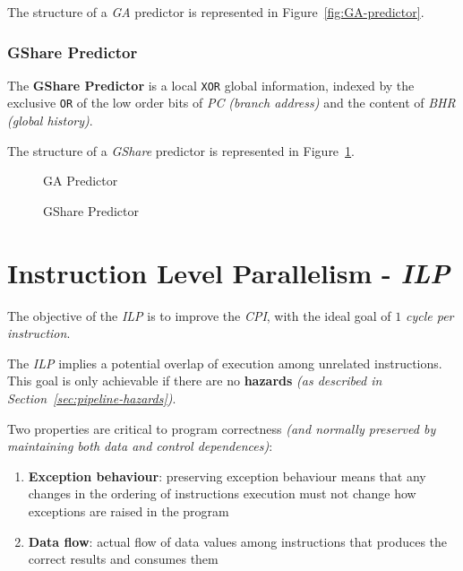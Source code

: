 \documentclass[english]{article}
\begin{document}
The structure of a \textit{GA} predictor is represented in Figure~\ref{fig:GA-predictor}.

\subsubsection{GShare Predictor}

The \textbf{GShare Predictor} is a local \texttt{XOR} global information, indexed by the exclusive \texttt{OR} of the low order bits of \textit{PC} \textit{(branch address)} and the content of \textit{BHR} \textit{(global history)}.

The structure of a \textit{GShare} predictor is represented in Figure~\ref{fig:GShare-predictor}.

\begin{figure}[htbp]
  \bigskip
  \centering
  \begin{minipage}[b]{0.6\textwidth}
    \centering
    \caption{GA Predictor}
    \label{fig:GA-predictor}
  \end{minipage}
  \begin{minipage}[b]{0.39\textwidth}
    \centering
    \caption{GShare Predictor}
    \label{fig:GShare-predictor}
  \end{minipage}
  \bigskip
\end{figure}

\clearpage

\section{Instruction Level Parallelism - \textit{ILP}}

The objective of the \textit{ILP} is to improve the \textit{CPI}, with the ideal goal of \(1\) \textit{cycle per instruction}.

The \textit{ILP} implies a potential overlap of execution among unrelated instructions.
This goal is only achievable if there are no \textbf{hazards} \textit{(as described in Section~\ref{sec:pipeline-hazards})}.

\bigskip
Two properties are critical to program correctness \textit{(and normally preserved by maintaining both data and control dependences)}:

\begin{enumerate}
  \item \textbf{Exception behaviour}: preserving exception behaviour means that any changes in the ordering of instructions execution must not change how exceptions are raised in the program
  \item \textbf{Data flow}: actual flow of data values among instructions that produces the correct results and consumes them
\end{enumerate}
\end{document}
